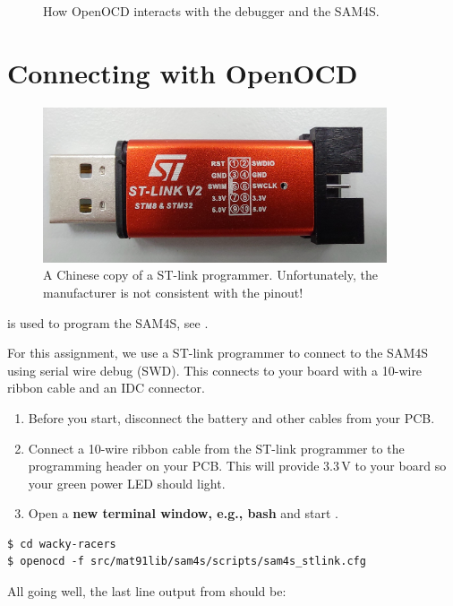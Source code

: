 \begin{figure}

\caption{How OpenOCD interacts with the debugger and the SAM4S.}
\label{fig:openocd diagram}
\end{figure}


\section{Connecting with OpenOCD}
\label{openocd}

\begin{figure}[!h]
  \centering \includegraphics[width=4in]{figs/stlink.jpg}
  \caption{A Chinese copy of a ST-link programmer.  Unfortunately, the
    manufacturer is not consistent with the pinout!}
  \label{fig:stlink}
\end{figure}


 is used to program the SAM4S, see .

For this assignment, we use a ST-link programmer to connect to the
SAM4S using serial wire debug (SWD). This connects to your board with
a 10-wire ribbon cable and an IDC connector.

\begin{enumerate}
\item
  Before you start, disconnect the battery and other cables from your
  PCB.
\item
  Connect a 10-wire ribbon cable from the ST-link programmer to the
  programming header on your PCB. This will provide 3.3\,V to your
  board so your green power LED should light.
\item
  Open a \textbf{new terminal window, e.g., bash} and
  start .
\end{enumerate}

\begin{verbatim}
$ cd wacky-racers
$ openocd -f src/mat91lib/sam4s/scripts/sam4s_stlink.cfg
\end{verbatim}

All going well, the last line output from  should be:

